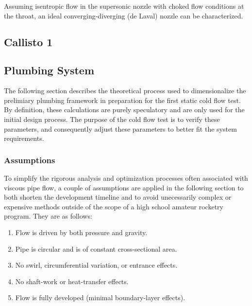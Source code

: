 \documentclass[9pt]{article} %
\numberwithin{equation}{section} %
\begin{document}
Assuming isentropic flow in the supersonic nozzle with choked flow conditions at the throat, an ideal converging-diverging (de Laval) nozzle can be characterized.
\subsection{Callisto 1}

\subsection{Plumbing System}
The following section describes the theoretical process used to dimensionalize the prelimiary plumbing framework in preparation for the first static cold flow test. By definition, these calculations are purely speculatory and are only used for the initial design process. The purpose of the cold flow test is to verify these parameters, and consequently adjust these parameters to better fit the system requirements.
\subsubsection{Assumptions} \label{sec:assumptions}

To simplify the rigorous analysis and optimization processes often associated with viscous pipe flow, a couple of assumptions are applied in the following section to both shorten the development timeline and to avoid unecessarily complex or expensive methods outside of the scope of a high school amateur rocketry program. They are as follows:
\begin{enumerate}
\item Flow is driven by both pressure and gravity.
\item Pipe is circular and is of constant cross-sectional area. \label{itm:constant-area}
\item No swirl, circumferential variation, or entrance effects.
\item No shaft-work or heat-transfer effects. \label{itm:heat-effects}
\item Flow is fully developed (minimal boundary-layer effects).
\end{enumerate}
\end{document}

